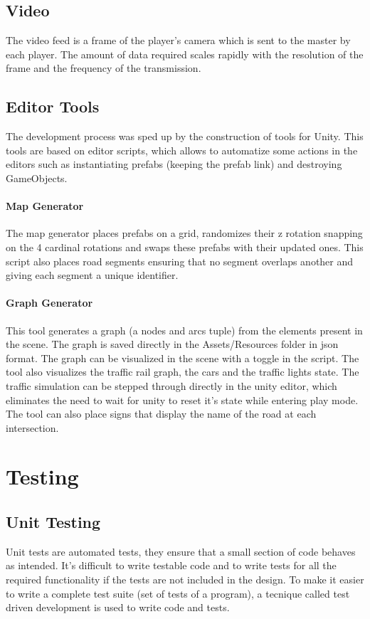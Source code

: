 \documentclass[12pt]{article}
\begin{document}
\subsection{Video}
The video feed is a frame of the player's camera which is sent to the master by each player. The amount of data required scales rapidly with the resolution of the frame and the frequency of the transmission.

\subsection{Editor Tools}
The development process was sped up by the construction of tools for Unity. This tools are based on editor scripts, which allows to automatize some actions in the editors such as instantiating prefabs (keeping the prefab link) and destroying GameObjects.
\paragraph{Map Generator}
The map generator places prefabs on a grid, randomizes their z rotation snapping on the 4 cardinal rotations and swaps these prefabs with their updated ones. This script also places road segments ensuring that no segment overlaps another and giving each segment a unique identifier.
\paragraph{Graph Generator}
This tool generates a graph (a nodes and arcs tuple) from the elements present in the scene. The graph is saved directly in the Assets/Resources folder in json format. The graph can be visualized in the scene with a toggle in the script. The tool also visualizes the traffic rail graph, the cars and the traffic lights state. The traffic simulation can be stepped through directly in the unity editor, which eliminates the need to wait for unity to reset it's state while entering play mode. The tool can also place signs that display the name of the road at each intersection.

\clearpage

\section{Testing}
\subsection{Unit Testing}
Unit tests are automated tests, they ensure that a small section of code behaves as intended. It's difficult to write testable code and to write tests for all the required functionality if the tests are not included in the design. To make it easier to write a complete test suite (set of tests of a program), a tecnique called test driven development is used to write code and tests.
\end{document}
